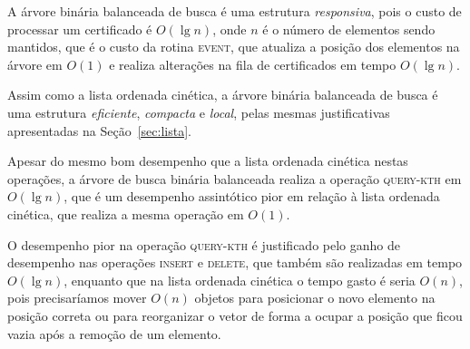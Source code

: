 A árvore binária balanceada de busca é uma estrutura \textit{responsiva}, pois o
custo de processar um certificado é $O(\lg{n})$, onde $n$ é o número de elementos sendo mantidos,
que é o custo da rotina \textsc{event}, que atualiza a posição dos elementos na árvore em $O(1)$ e
realiza alterações na fila de certificados em tempo $O(\lg{n})$.

Assim como a lista ordenada cinética, a árvore binária balanceada de busca é uma
estrutura \textit{eficiente}, \textit{compacta} e \textit{local}, pelas mesmas
justificativas apresentadas na Seção~\ref{sec:lista}.

Apesar do mesmo bom desempenho que a lista ordenada cinética nestas operações, a árvore de busca
binária balanceada realiza a operação \textsc{query-kth} em $O(\lg{n})$, que é um
desempenho assintótico pior em relação à lista ordenada cinética, que realiza a
mesma operação em $O(1)$.

O desempenho pior na operação \textsc{query-kth} é justificado pelo ganho de
desempenho nas operações \textsc{insert} e \textsc{delete}, que também são
realizadas em tempo $O(\lg{n})$, enquanto que na lista ordenada cinética o tempo
gasto é seria $O(n)$, pois precisaríamos mover $O(n)$ objetos para posicionar o novo
elemento na posição correta ou para reorganizar o vetor de forma a ocupar a
posição que ficou vazia após a remoção de um elemento.
